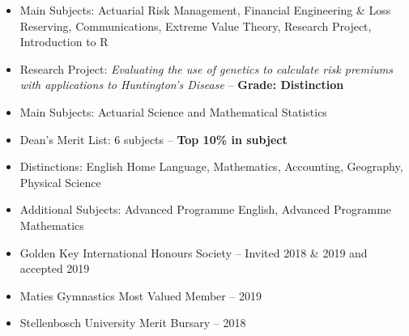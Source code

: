 \documentclass[10pt,a4paper]{altacv}
\begin{document}

\begin{itemize}
    \setlength{\itemindent}{0.5em}
    \item   \small{Main Subjects: Actuarial Risk Management, Financial Engineering \& Loss Reserving, Communications, Extreme Value Theory, Research Project, Introduction to R}
    \item   \small{Research Project: \textit{Evaluating the use of genetics to calculate risk premiums with applications to Huntington's Disease} -- \textbf{Grade: Distinction}}
\end{itemize}

\medskip



\begin{itemize}
    \setlength{\itemindent}{0.5em}
    \item   \small{Main Subjects: Actuarial Science and Mathematical Statistics}
    \item \small{Dean's Merit List: 6 subjects -- \textbf{Top 10\% in subject}}
\end{itemize}
\medskip
{}

\begin{itemize}
    \setlength{\itemindent}{0.5em}
    \item   \small{Distinctions: English Home Language, Mathematics, Accounting, Geography, Physical Science}
    \item   \small{Additional Subjects: Advanced Programme English, Advanced Programme Mathematics}
\end{itemize}

\begin{itemize}
    \setlength{\itemindent}{0.5em}
    \item \small{Golden Key International Honours Society -- Invited 2018 \& 2019 and accepted 2019}
    \item \small{Maties Gymnastics Most Valued Member -- 2019} 
    \item \small{Stellenbosch University Merit Bursary -- 2018}
\end{itemize}


\end{document}
